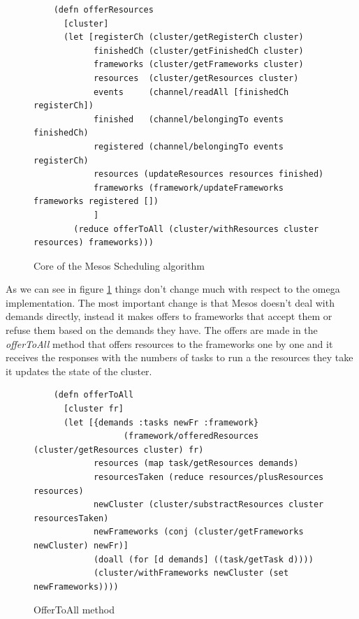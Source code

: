 \documentclass{svjour3}                     %
\begin{document}
\begin{figure}[!ht]
\centering
\begin{verbatim}
    (defn offerResources
      [cluster]
      (let [registerCh (cluster/getRegisterCh cluster) 
            finishedCh (cluster/getFinishedCh cluster) 
            frameworks (cluster/getFrameworks cluster)
            resources  (cluster/getResources cluster)
            events     (channel/readAll [finishedCh registerCh])
            finished   (channel/belongingTo events finishedCh)
            registered (channel/belongingTo events registerCh)
            resources (updateResources resources finished)
            frameworks (framework/updateFrameworks frameworks registered [])
            ]
        (reduce offerToAll (cluster/withResources cluster resources) frameworks)))

\end{verbatim}
\caption{Core of the Mesos Scheduling algorithm}
\label{fig:mesos-implementation}
\end{figure}

As we can see in figure \ref{fig:mesos-implementation} things don't
change much with respect to the omega implementation. The most
important change is that Mesos doesn't deal with demands directly,
instead it makes offers to frameworks that accept them or refuse them
based on the demands they have. The offers are made in the \emph{offerToAll}
method that offers resources to the frameworks one by one and it
receives the responses with the numbers of tasks to run a the
resources they take it updates the state of the cluster.

\begin{figure}[!ht]
\centering
\begin{verbatim}
    (defn offerToAll
      [cluster fr]
      (let [{demands :tasks newFr :framework}
                  (framework/offeredResources (cluster/getResources cluster) fr)
            resources (map task/getResources demands)
            resourcesTaken (reduce resources/plusResources resources)
            newCluster (cluster/substractResources cluster resourcesTaken)
            newFrameworks (conj (cluster/getFrameworks newCluster) newFr)]
            (doall (for [d demands] ((task/getTask d))))
            (cluster/withFrameworks newCluster (set newFrameworks))))

\end{verbatim}

\caption{OfferToAll method}
\label{fig:mesos-offerToAll}
\end{figure}
\end{document}
